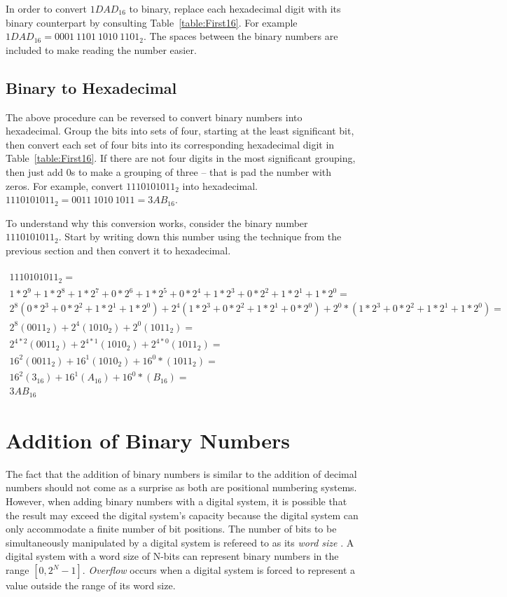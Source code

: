 In order to convert $1DAD_{16}$ to binary, replace each hexadecimal
digit with its binary counterpart by consulting Table~\ref{table:First16}.
For example $1DAD_{16} = 0001~1101~1010~1101_{2}$.  The spaces between the
binary numbers are included to make reading the number easier.

\subsection{Binary to Hexadecimal}
The above procedure can be reversed to convert binary numbers into 
hexadecimal.  Group the bits into sets of four, starting at the least
significant bit, then convert each set of four bits into its corresponding
hexadecimal digit in Table~\ref{table:First16}.  
If there are not four digits in the most significant 
grouping, then just add 0s to make a grouping of three -- that is 
pad the number with zeros.  For example, convert  $1110101011_2$ into 
hexadecimal. $1110101011_2 = 0011~1010~1011 = 3AB_{16}$.

To understand why this conversion works, consider the binary 
number $1110101011_2$.  Start by writing down this number using the 
technique from the previous section and then convert it to hexadecimal.
\\ \\
{\tiny
$\begin{array}{l}
1110101011_2= \\
1*2^9+1*2^8+1*2^7+0*2^6+1*2^5+0*2^4+1*2^3+0*2^2+1*2^1+1*2^0 = \\
2^8(0*2^3+0*2^2+1*2^1+1*2^0) + 2^4(1*2^3+0*2^2+1*2^1+0*2^0) + 2^0*(1*2^3+0*2^2+1*2^1+1*2^0) =\\
2^8(0011_2) + 2^4(1010_2) +  2^0(1011_2) =\\
2^{4*2}(0011_2) + 2^{4*1}(1010_2) +  2^{4*0}(1011_2) =\\
16^2(0011_2) + 16^1(1010_2) + 16^0*(1011_2) =\\
16^2(3_{16}) + 16^1(A_{16}) + 16^0*(B_{16}) =\\
3AB_{16}
\end{array}$
} 


\section{Addition of Binary Numbers}
\label{page:addition}
The fact that the addition of binary numbers is similar to the 
addition of decimal numbers should not come as a surprise as both
are positional numbering systems. However, when adding binary numbers
with a digital system, it is possible that the result may exceed the
digital system's capacity because the digital system can only accommodate a 
finite number of bit positions.  The number of bits to be 
simultaneously manipulated by a digital system is refereed to as 
its {\it word size} .  A digital system with a
word size of N-bits can represent binary numbers in the range 
$[0, 2^N-1]$.  {\it Overflow}  occurs when a 
digital system is forced to represent a value outside the range 
of its word size.

